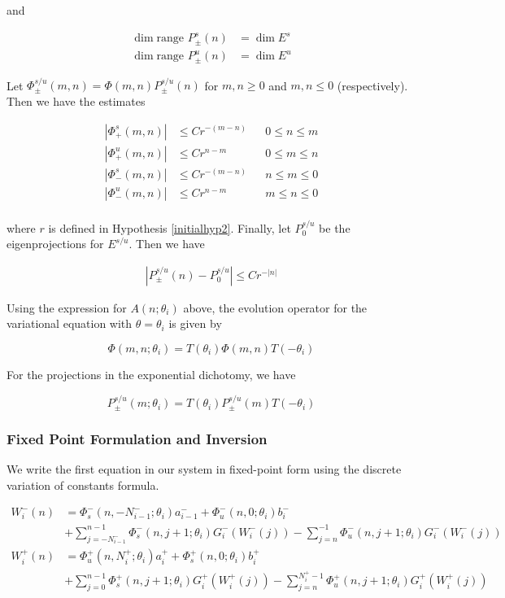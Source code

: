\documentclass[12pt]{article}
\begin{document}
and

\begin{align*}
\dim \text{range }P_\pm^s(n) &= \dim E^s \\
\dim \text{range }P_\pm^u(n) &= \dim E^u
\end{align*}

Let $\Phi_\pm^{s/u}(m, n) = \Phi(m, n) P_\pm^{s/u}(n)$ for $m, n \geq 0$ and $m, n \leq 0$ (respectively). Then we have the estimates

\begin{align*}
|\Phi_+^s(m, n)| &\leq C r^{-(m - n)} && 0 \leq n \leq m \\
|\Phi_+^u(m, n)| &\leq C r^{n-m} && 0 \leq m \leq n \\
|\Phi_-^s(m, n)| &\leq C r^{-(m - n)} && n \leq m \leq 0 \\
|\Phi_-^u(m, n)| &\leq C r^{n-m} && m \leq n \leq 0\\
\end{align*}

where $r$ is defined in Hypothesis \ref{initialhyp2}. Finally, let $P_0^{s/u}$ be the eigenprojections for $E^{s/u}$. Then we have

\begin{align}\label{projbound}
| P_\pm^{s/u}(n) - P_0^{s/u} | \leq C r^{-|n|}
\end{align}

Using the expression for $A(n; \theta_i)$ above, the evolution operator for the variational equation with $\theta = \theta_i$ is given by 

\[
\Phi(m, n; \theta_i) = T(\theta_i) \Phi(m,n) T(-\theta_i)
\]

For the projections in the exponential dichotomy, we have

\[
P_\pm^{s/u}(m; \theta_i) = T(\theta_i) P_\pm^{s/u}(m) T(-\theta_i)
\]

\subsubsection{Fixed Point Formulation and Inversion}

We write the first equation in our system in fixed-point form using the discrete variation of constants formula.

\begin{align*}
W_i^-(n) &= 
\Phi_s^-(n, -N_{i-1}^-; \theta_i) a_{i-1}^- + \Phi_u^-(n, 0; \theta_i) b_i^-  \\
&+ \sum_{j = -N_{i-1}^-}^{n-1} \Phi_s^-(n, j+1; \theta_i) G_i^-(W_i^-(j)) - \sum_{j = n}^{-1} \Phi_u^-(n, j+1; \theta_i) G_i^-(W_i^-(j)) \\
W_i^+(n) &= \Phi_u^+(n, N_i^+; \theta_i) a_i^+ + \Phi_s^+(n, 0; \theta_i) b_i^+ \\
&+ \sum_{j = 0}^{n-1} \Phi_s^+(n, j+1; \theta_i) G_i^+(W_i^+(j)) 
- \sum_{j = n}^{N_i^+-1} \Phi_u^+(n, j+1; \theta_i) G_i^+(W_i^+(j))
\end{align*}
\end{document}
